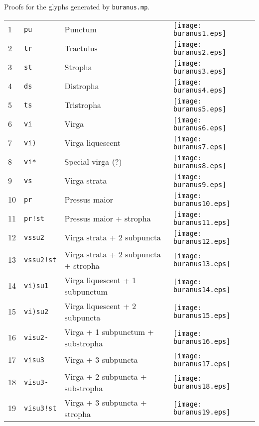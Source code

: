 \documentclass{scrarticle}
\begin{document}
Proofs for the glyphs generated by \texttt{buranus.mp}.

\vspace{1cm}

\begin{longtable}{l|l|l|l}
1 & \texttt{pu} & Punctum & \texttt{[image: buranus1.eps]} \\
2 & \texttt{tr} & Tractulus & \texttt{[image: buranus2.eps]} \\
3 & \texttt{st} & Stropha & \texttt{[image: buranus3.eps]} \\
4 & \texttt{ds} & Distropha & \texttt{[image: buranus4.eps]} \\
5 & \texttt{ts} & Tristropha & \texttt{[image: buranus5.eps]} \\
6 & \texttt{vi} & Virga & \texttt{[image: buranus6.eps]} \\
7 & \texttt{vi)} & Virga liquescent & \texttt{[image: buranus7.eps]} \\
8 & \texttt{vi*} & Special virga (?) & \texttt{[image: buranus8.eps]} \\
9 & \texttt{vs} & Virga strata & \texttt{[image: buranus9.eps]} \\
10 & \texttt{pr} & Pressus maior & \texttt{[image: buranus10.eps]} \\
11 & \texttt{pr!st} & Pressus maior + stropha & \texttt{[image: buranus11.eps]} \\
12 & \texttt{vssu2} & Virga strata + 2 subpuncta & \texttt{[image: buranus12.eps]} \\
13 & \texttt{vssu2!st} & Virga strata + 2 subpuncta + stropha & \texttt{[image: buranus13.eps]} \\
14 & \texttt{vi)su1} & Virga liquescent + 1 subpunctum & \texttt{[image: buranus14.eps]} \\
15 & \texttt{vi)su2} & Virga liquescent + 2 subpuncta & \texttt{[image: buranus15.eps]} \\
16 & \texttt{visu2-} & Virga + 1 subpunctum + substropha & \texttt{[image: buranus16.eps]} \\
17 & \texttt{visu3} & Virga + 3 subpuncta & \texttt{[image: buranus17.eps]} \\
18 & \texttt{visu3-} & Virga + 2 subpuncta + substropha & \texttt{[image: buranus18.eps]} \\
19 & \texttt{visu3!st} & Virga + 3 subpuncta + stropha & \texttt{[image: buranus19.eps]} \\

\end{longtable}
\end{document}
